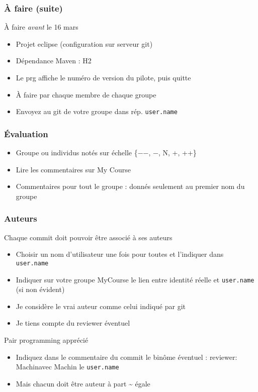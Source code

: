 \documentclass[english, french]{beamer}
\begin{document}
\begin{frame}
	\frametitle{À faire (suite)}
	\begin{block}{À faire \emph{avant} le 16 mars}
		\begin{itemize}
			\item Projet eclipse (configuration sur serveur git)
			\item Dépendance Maven : H2
			\item Le prg affiche le numéro de version du pilote, puis quitte
			\item À faire par chaque membre de chaque groupe
			\item Envoyez au git de votre groupe dans rép. \texttt{user.name}
		\end{itemize}
	\end{block}
\end{frame}

\begin{frame}
	\frametitle{Évaluation}
	\begin{itemize}
		\item Groupe ou individus notés sur échelle \{−{−}, {−}, N, +, ++\}
		\item Lire les commentaires sur My Course
		\item Commentaires pour tout le groupe : donnés seulement au premier nom du groupe
	\end{itemize}
\end{frame}

\begin{frame}
	\frametitle{Auteurs}
	Chaque commit doit pouvoir être associé à ses auteurs
	\begin{itemize}
		\item Choisir un nom d’utilisateur \alert{une fois pour toutes} et l’indiquer dans \texttt{user.name}
		\item Indiquer sur votre groupe MyCourse le lien entre identité réelle et \texttt{user.name} (si non évident)
		\item Je considère le vrai auteur comme celui indiqué par git
		\item Je tiens compte du reviewer éventuel
	\end{itemize}
	Pair programming apprécié
	\begin{itemize}
		\item Indiquez dans le commentaire du commit le binôme éventuel : \og\alert{reviewer: Machin}\fg avec Machin le \texttt{user.name}
		\item Mais chacun doit être auteur à part \sim{} égale
	\end{itemize}
\end{frame}
\end{document}

